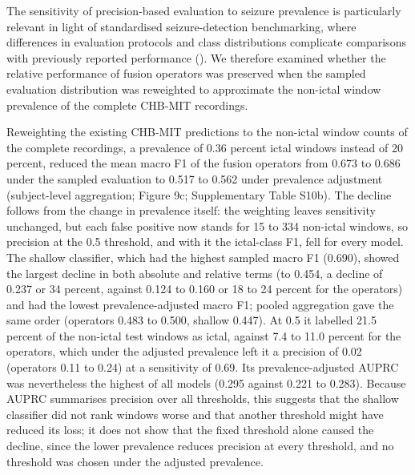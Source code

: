 \documentclass[11pt,a4paper]{article}
\begin{document}
The sensitivity of precision-based evaluation to seizure prevalence is particularly
relevant in light of standardised seizure-detection benchmarking, where differences in
evaluation protocols and class distributions complicate comparisons with previously
reported performance (\citealp{Samanos_2025}). We therefore examined whether the relative
performance of fusion operators was preserved when the sampled evaluation distribution was
reweighted to approximate the non-ictal window prevalence of the complete CHB-MIT
recordings.

Reweighting the existing CHB-MIT predictions to the non-ictal window counts of the
complete recordings, a prevalence of 0.36 percent ictal windows instead of 20 percent,
reduced the mean macro F1 of the fusion operators from 0.673 to 0.686 under the sampled
evaluation to 0.517 to 0.562 under prevalence adjustment (subject-level aggregation;
Figure 9c; Supplementary Table S10b). The decline follows from the change in prevalence
itself: the weighting leaves sensitivity unchanged, but each false positive now stands
for 15 to 334 non-ictal windows, so precision at the 0.5 threshold, and with it the
ictal-class F1, fell for every model. The shallow classifier, which had the highest
sampled macro F1 (0.690), showed the largest decline in both absolute and relative terms
(to 0.454, a decline of 0.237 or 34 percent, against 0.124 to 0.160 or 18 to 24 percent
for the operators) and had the lowest prevalence-adjusted macro F1; pooled aggregation
gave the same order (operators 0.483 to 0.500, shallow 0.447). At 0.5 it labelled 21.5
percent of the non-ictal test windows as ictal, against 7.4 to 11.0 percent for the
operators, which under the adjusted prevalence left it a precision of 0.02 (operators
0.11 to 0.24) at a sensitivity of 0.69. Its prevalence-adjusted AUPRC was nevertheless the
highest of all models (0.295 against 0.221 to 0.283). Because AUPRC summarises precision
over all thresholds, this suggests that the shallow classifier did not rank windows
worse and that another threshold might have reduced its loss; it does not show that the
fixed threshold alone caused the decline, since the lower prevalence reduces precision
at every threshold, and no threshold was chosen under the adjusted prevalence.
\end{document}
